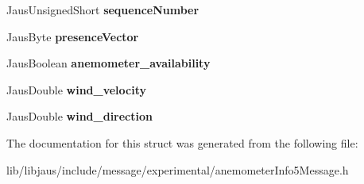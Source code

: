 \begin{DoxyCompactItemize}
\item 
\hypertarget{struct_anemometer_info5_message_struct_a485476a53894941093d9942133733cb4}{\-Jaus\-Unsigned\-Short {\bfseries sequence\-Number}}\label{struct_anemometer_info5_message_struct_a485476a53894941093d9942133733cb4}

\item 
\hypertarget{struct_anemometer_info5_message_struct_a1c513865a8cc3020959e0f9cf16e7e8a}{\-Jaus\-Byte {\bfseries presence\-Vector}}\label{struct_anemometer_info5_message_struct_a1c513865a8cc3020959e0f9cf16e7e8a}

\item 
\hypertarget{struct_anemometer_info5_message_struct_ab6a95613e5985b2c16e6067c6b3a15d0}{\-Jaus\-Boolean {\bfseries anemometer\-\_\-availability}}\label{struct_anemometer_info5_message_struct_ab6a95613e5985b2c16e6067c6b3a15d0}

\item 
\hypertarget{struct_anemometer_info5_message_struct_a7569d41671b72157597b7e5cdfa789ed}{\-Jaus\-Double {\bfseries wind\-\_\-velocity}}\label{struct_anemometer_info5_message_struct_a7569d41671b72157597b7e5cdfa789ed}

\item 
\hypertarget{struct_anemometer_info5_message_struct_a319643d5197d789748955463a438a9ee}{\-Jaus\-Double {\bfseries wind\-\_\-direction}}\label{struct_anemometer_info5_message_struct_a319643d5197d789748955463a438a9ee}

\end{DoxyCompactItemize}


\-The documentation for this struct was generated from the following file\-:\begin{DoxyCompactItemize}
\item 
lib/libjaus/include/message/experimental/anemometer\-Info5\-Message.\-h\end{DoxyCompactItemize}
